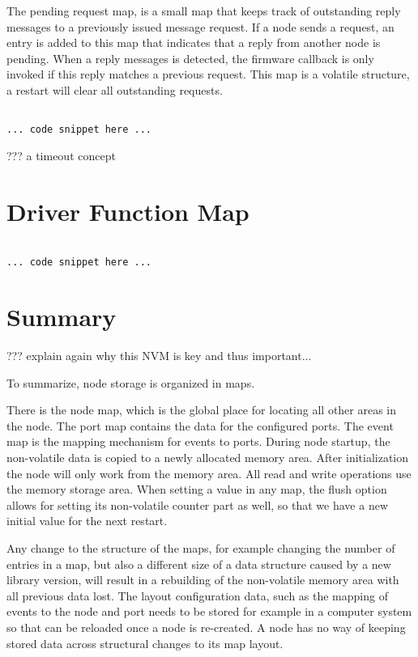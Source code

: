The pending request map, is a small map that keeps track of outstanding reply messages to a previously issued message request. If a node sends a request, an entry is added to this map that indicates that a reply from another node is pending. When a reply messages is detected, the firmware callback is only invoked if this reply matches a previous request. This map is a volatile structure, a restart will clear all outstanding requests.

\lstset{language=c++, style=codesnippetstyle}
\begin{lstlisting}

... code snippet here ...

\end{lstlisting}
\FloatBarrier

??? a timeout concept

\section{Driver Function Map}

\lstset{language=c++, style=codesnippetstyle}
\begin{lstlisting}

... code snippet here ...

\end{lstlisting}
\FloatBarrier

\section{Summary}

??? explain again why this NVM is key and thus important...

To summarize, node storage is organized in maps. 

There is the node map, which is the global place for locating all other areas in the node. The port map contains the data for the configured ports. The event map is the mapping mechanism for events to ports. During node startup, the non-volatile data is copied to a newly allocated memory area. After initialization the node will only work from the memory area. All read and write operations use the memory storage area. When setting a value in any map, the flush option allows for setting its non-volatile counter part as well, so that we have a new initial value for the next restart.

Any change to the structure of the maps, for example changing the number of entries in a map, but also a different size of a data structure caused by a new library version, will result in a rebuilding of the non-volatile memory area with all previous data lost. The layout configuration data, such as the mapping of events to the node and port needs to be stored for example in a computer system so that can be reloaded once a node is re-created. A node has no way of keeping stored data across structural changes to its map layout.
